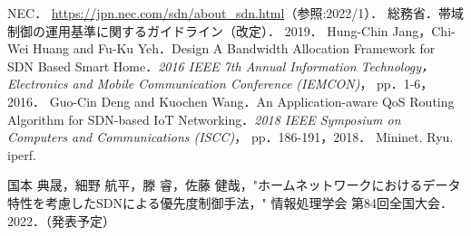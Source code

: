\documentclass[a4paper,11pt,uplatex]{ujreport}
\begin{document}
\renewcommand{\bibname}{参考文献}

\begin{thebibliography}{99}
   NEC． \url{https://jpn.nec.com/sdn/about_sdn.html}（参照:2022/1）．
   総務省．帯域制御の運用基準に関するガイドライン（改定）． 2019．
   Hung-Chin Jang，Chi-Wei Huang and Fu-Ku Yeh．Design
  A Bandwidth Allocation Framework for SDN Based Smart
  Home．\textit{2016 IEEE 7th Annual Information Technology，
  Electronics and Mobile Communication Conference (IEMCON)}，
  pp．1-6，2016．
   Guo-Cin Deng and Kuochen Wang．An Application-aware QoS Routing Algorithm for SDN-based IoT Networking．\textit{2018 IEEE Symposium on Computers and Communications (ISCC)}， pp．186-191，2018．
   Mininet.
   Ryu.
   iperf.
\end{thebibliography}

% 
% 

\label{chap:Bibiliography}

\renewcommand{\bibname}{研究業績}

\begin{thebibliography}{99}
  \bibitem{} 国本 典晟，細野 航平，滕 睿，佐藤 健哉，"ホームネットワークにおけるデータ特性を考慮したSDNによる優先度制御手法，" 情報処理学会 第84回全国大会．2022．（発表予定）
\end{thebibliography}

\label{chap:Publications}

\end{document}
